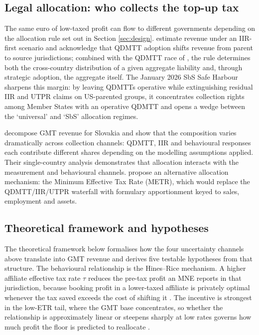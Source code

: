 \documentclass[11pt,a4paper]{article}
\begin{document}
\subsection{Legal allocation: who collects the top-up tax}\label{sec:allocation_lit}

The same euro of low-taxed profit can flow to different governments depending on the allocation rule set out in Section \ref{sec:design}. \citet{barake2022} estimate revenue under an IIR-first scenario and acknowledge that QDMTT adoption shifts revenue from parent to source jurisdictions; combined with the QDMTT race of \citet{devereux2022}, the rule determines both the cross-country distribution of a given aggregate liability and, through strategic adoption, the aggregate itself. The January 2026 SbS Safe Harbour sharpens this margin: by leaving QDMTTs operative while extinguishing residual IIR and UTPR claims on US-parented groups, it concentrates collection rights among Member States with an operative QDMTT and opens a wedge between the `universal' and `SbS' allocation regimes.

\citet{boukal2026} decompose GMT revenue for Slovakia and show that the composition varies dramatically across collection channels: QDMTT, IIR and behavioural responses each contribute different shares depending on the modelling assumptions applied. Their single-country analysis demonstrates that allocation interacts with the measurement and behavioural channels. \citet{cobham2022} propose an alternative allocation mechanism: the Minimum Effective Tax Rate (METR), which would replace the QDMTT/IIR/UTPR waterfall with formulary apportionment keyed to sales, employment and assets. 

\subsection{Theoretical framework and hypotheses}\label{sec:theoretical_framework}\label{sec:hypotheses}

The theoretical framework below formalises how the four uncertainty channels above translate into GMT revenue and derives five testable hypotheses from that structure. The behavioural relationship is the Hines--Rice mechanism. A higher affiliate effective tax rate $\tau$ reduces the pre-tax profit an MNE reports in that jurisdiction, because booking profit in a lower-taxed affiliate is privately optimal whenever the tax saved exceeds the cost of shifting it \citep{hines1994,heckemeyer2017}. The incentive is strongest in the low-ETR tail, where the GMT base concentrates, so whether the relationship is approximately linear or steepens sharply at low rates governs how much profit the floor is predicted to reallocate \citep{dowd2017,garcia-bernardo2024}.
\end{document}
